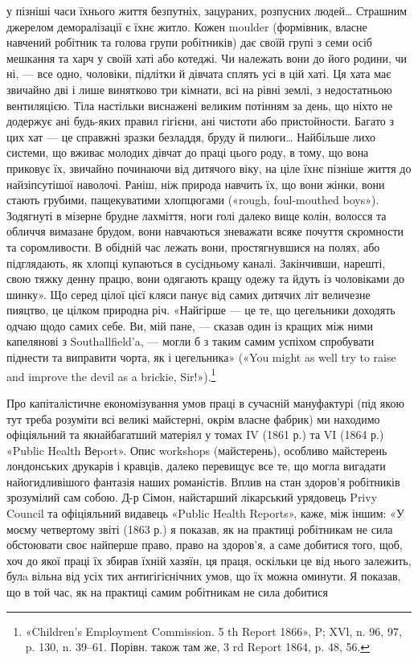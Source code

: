 \parcont{}  %
у пізніші часи їхнього життя безпутніх, зацураних, розпусних
людей\dots{} Страшним джерелом деморалізації є їхнє житло. Кожен
moulder (формівник, власне навчений робітник та голова групи
робітників) дає своїй групі з семи осіб мешкання та харч у своїй
хаті або котеджі. Чи належать вони до його родини, чи ні, — все
одно, чоловіки, підлітки й дівчата сплять усі в цій хаті. Ця хата
має звичайно дві і лише винятково три кімнати, всі на рівні землі,
з недостатньою вентиляцією. Тіла настільки виснажені великим
потінням за день, що ніхто не додержує ані будь-яких правил
гігієни, ані чистоти або пристойности. Багато з цих хат — це
справжні зразки безладдя, бруду й пилюги\dots{} Найбільше лихо
системи, що вживає молодих дівчат до праці цього роду, в тому,
що вона приковує їх, звичайно починаючи від дитячого віку, на
ціле їхнє пізніше життя до найзіпсутішої наволочі. Раніш, ніж
природа навчить їх, що вони жінки, вони стають грубими, пащекуватими
хлопцюгами («rough, foul-mouthed boys»). Зодягнуті
в мізерне брудне лахміття, ноги голі далеко вище колін, волосся
та обличчя вимазане брудом, вони навчаються зневажати всяке
почуття скромности та соромливости. В обідній час лежать вони,
простягнувшися на полях, або підглядають, як хлопці купаються
в сусідньому каналі. Закінчивши, нарешті, свою тяжку денну
працю, вони одягають кращу одежу та йдуть із чоловіками до
шинку». Що серед цілої цієї кляси панує від самих дитячих літ
величезне пияцтво, це цілком природна річ. «Найгірше — це те,
що цегельники доходять одчаю щодо самих себе. Ви, мій пане, —
сказав один із кращих між ними капелянові з Southallfield’a, —
могли б з таким самим успіхом спробувати піднести та виправити
чорта, як і цегельника» («You might as well try to raise and
improve the devil as a brickie, Sir!»).\footnote{
«Children’s Employment Commission. 5 th Report 1866», P; XVl,
n. 96, 97, p. 130, n. 39--61. Порівн. також там же, 3 rd Report 1864,
p. 48, 56.
}

Про капіталістичне економізування умов праці в сучасній
мануфактурі (під якою тут треба розуміти всі великі майстерні,
окрім власне фабрик) ми находимо офіціяльний та якнайбагатший
матеріял у томах IV (1861 р.) та VI (1864 р.) «Public Health Веport».
Опис workshops (майстерень), особливо майстерень лондонських
друкарів і кравців, далеко перевищує все те, що могла вигадати
найогидливішого фантазія наших романістів. Вплив на
стан здоров’я робітників зрозумілий сам собою. Д-р Сімон, найстарший
лікарський урядовець Privy Council та офіціяльний
видавець «Public Health Reports», каже, між іншим: «У моєму
четвертому звіті (1863 р.) я показав, як на практиці робітникам
не сила обстоювати своє найперше право, право на здоров’я,
а саме добитися того, щоб, хоч до якої праці їх збирав їхній хазяїн,
ця праця, оскільки це від нього залежить, булa вільна від
усіх тих антигігієнічних умов, що їх можна оминути. Я показав,
що в той час, як на практиці самим робітникам не сила добитися
\parbreak{}  %
